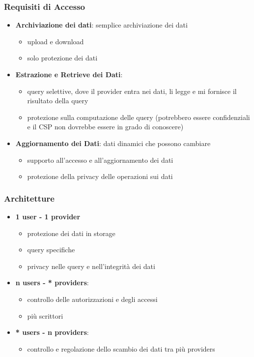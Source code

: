 \subsubsection{Requisiti di Accesso}
\begin{itemize}
    \item \textbf{Archiviazione dei dati}: semplice archiviazione dei dati
    \begin{itemize}
        \item upload e download
        \item solo protezione dei dati
    \end{itemize}
    \item \textbf{Estrazione e Retrieve dei Dati}: 
    \begin{itemize}
        \item query selettive, dove il provider entra nei dati, li legge e mi fornisce il risultato della query
        \item protezione sulla computazione delle query (potrebbero essere confidenziali e il CSP non dovrebbe essere in grado di conoscere)
    \end{itemize}
    \item \textbf{Aggiornamento dei Dati}: dati dinamici che possono cambiare
    \begin{itemize}
        \item supporto all'accesso e all'aggiornamento dei dati
        \item protezione della privacy delle operazioni sui dati
    \end{itemize}
\end{itemize}

\subsubsection{Architetture}
\begin{itemize}
    \item \textbf{1 user - 1 provider}
    \begin{itemize}
        \item protezione dei dati in storage
        \item query specifiche
        \item privacy nelle query e nell'integrità dei dati
    \end{itemize}
    \item \textbf{n users - * providers}: 
    \begin{itemize}
        \item controllo delle autorizzazioni e degli accessi
        \item più scrittori
    \end{itemize}
    \item \textbf{* users - n providers}:
    \begin{itemize}
        \item controllo e regolazione dello scambio dei dati tra più providers
    \end{itemize}
\end{itemize}

